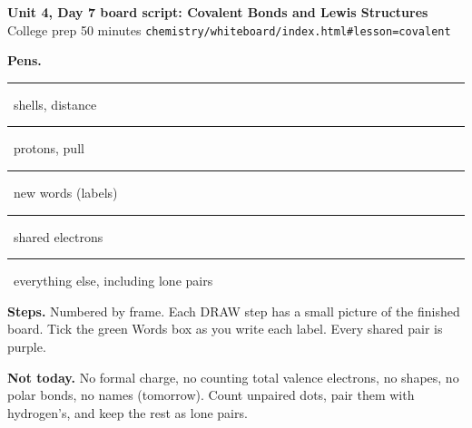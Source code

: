\documentclass[10.5pt]{article}
\newcommand{\pen}[2]{\textcolor{#1}{\rule{8pt}{8pt}}\ #2}
\begin{document}
\begin{center}{\Large\bfseries Unit 4, Day 7 board script: Covalent Bonds and Lewis Structures}\\[2pt]{\normalsize College prep \textbullet{} 50 minutes \textbullet{} \texttt{chemistry/whiteboard/index.html\#lesson=covalent}}\end{center}
\noindent\textbf{Pens.} \pen{pblue}{shells, distance} \quad \pen{pred}{protons, pull} \quad \pen{pgreen}{new words (labels)} \quad \pen{ppurple}{shared electrons} \quad \pen{black}{everything else, including lone pairs}\par
\noindent\textbf{Steps.} Numbered by frame. Each DRAW step has a small picture of the finished board. Tick the green Words box as you write each label. Every shared pair is purple.\par
\noindent\textbf{Not today.} No formal charge, no counting total valence electrons, no shapes, no polar bonds, no names (tomorrow). Count unpaired dots, pair them with hydrogen's, and keep the rest as lone pairs.\par\smallskip
\noindent{}\par\medskip
\end{document}
